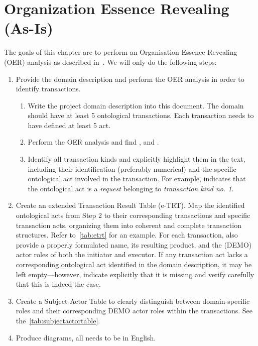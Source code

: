 \chapter{Organization Essence Revealing (As-Is)}


The goals of this chapter are to perform an Organisation Essence Revealing (OER) analysis as described in~\cite{dietz2015teoo,dietz2020enterprise}. We will only do the following steps: 

\begin{enumerate}
	\item Provide the domain description and perform the OER analysis in order to identify transactions.
	\begin{enumerate}
		\item Write the project domain description into this document. The domain should have at least 5 ontological transactions. Each transaction needs to have defined at least 5 act.
		\item Perform the OER analysis and find ,  and . 
		\item Identify all transaction kinds and explicitly highlight them in the text, including their identification (preferably numerical) and the specific ontological act involved in the transaction. For example, \oact{[TK1/rq]} indicates that the ontological act is a \textit{request} belonging to \textit{transaction kind no. 1}.
	\end{enumerate}
    \item Create an extended Transaction Result Table (e-TRT). Map the identified ontological acts from Step 2 to their corresponding transactions and specific transaction acts, organizing them into coherent and complete transaction structures. Refer to~\cref{tab:etrt} for an example. For each transaction, also provide a properly formulated name, its resulting product, and the (DEMO) actor roles of both the initiator and executor. If any transaction act lacks a corresponding ontological act identified in the domain description, it may be left empty—however, indicate explicitly that it is missing and verify carefully that this is indeed the case.
    \item Create a Subject-Actor Table to clearly distinguish between domain-specific roles and their corresponding DEMO actor roles within the transactions. See the~\cref{tab:subjectactortable}.
    \item Produce diagrams, all needs to be in English.

\end{enumerate}
